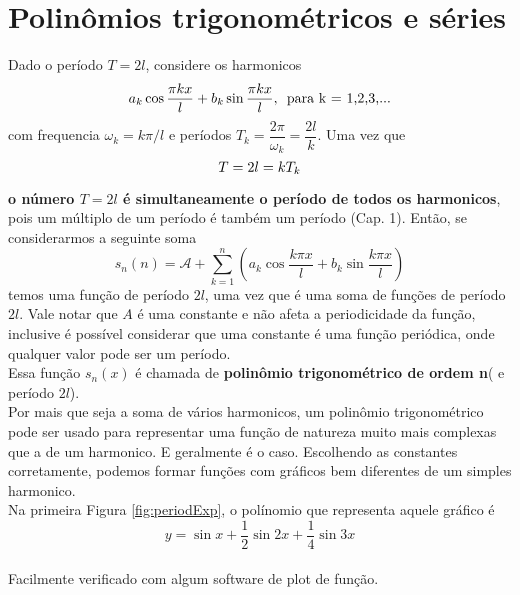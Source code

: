 \chapter{Polinômios trigonométricos e séries}
Dado o período $T=2l$, considere os harmonicos\\
\begin{equation}
    a_k\cos{\dfrac{\pi kx}{l}} + b_k\sin{\dfrac{\pi kx}{l}},\text{\hspace{5pt}para k = 1,2,3,...}
\end{equation}
com frequencia $\omega_k = k\pi/l$ e períodos $T_k = \dfrac{2\pi}{\omega_k} = \dfrac{2l}{k}$. 
Uma vez que 
\begin{equation}
\notag
    T = 2l = kT_k
\end{equation}  

\textbf{o número $T=2l$ é simultaneamente o período de todos os harmonicos},
pois um múltiplo de um período é também um período (Cap. 1). Então, se considerarmos 
a seguinte soma\\
\begin{equation}
    s_n(n) = \mathcal{A} + \sum\limits_{k=1}^{n}(a_k\cos{\dfrac{k\pi x}{l} + b_k\sin{\dfrac{k\pi x}{l}}})
\end{equation}
temos uma função de período $2l$, uma vez que é uma soma de funções de período 
$2l$. Vale notar que $A$ é uma constante e não afeta a periodicidade da função,
inclusive é possível considerar que uma constante é uma função periódica, onde 
qualquer valor pode ser um período.\\

Essa função $s_n(x)$ é chamada  de \textbf{polinômio trigonométrico de ordem n}(
e período $2l$).\\

Por mais que seja a soma de vários harmonicos, um polinômio trigonométrico pode 
ser usado para representar uma função de natureza muito mais complexas que a 
de um harmonico. E geralmente é o caso. Escolhendo as constantes corretamente,
podemos formar funções com gráficos bem diferentes de um simples harmonico.\\

Na primeira Figura \ref{fig:periodExp}, o polínomio que representa aquele gráfico é\\
\begin{equation}
    y = \sin{x} + \dfrac{1}{2}\sin{2x} + \dfrac{1}{4}\sin{3x}
\end{equation}
\\
Facilmente verificado com algum software de plot de função.\\
\\

